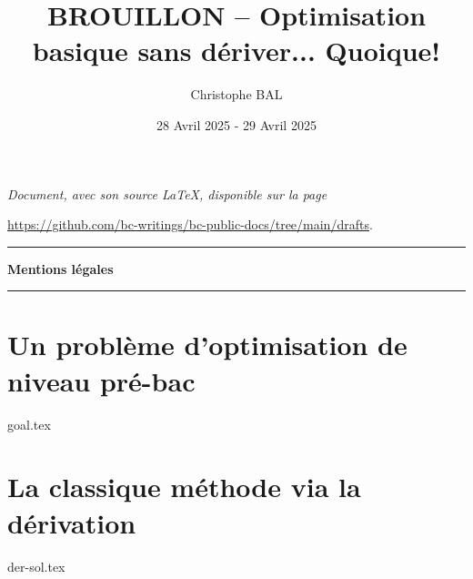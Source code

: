 \documentclass[12pt]{amsart}
\begin{document}
\title{BROUILLON -- Optimisation basique sans dériver... Quoique!}
\author{Christophe BAL}
\date{28 Avril 2025 - 29 Avril 2025}

\maketitle

\begin{center}
	\itshape
	Document, avec son source \LaTeX, disponible sur la page

	\url{https://github.com/bc-writings/bc-public-docs/tree/main/drafts}.
\end{center}


\bigskip


\begin{center}
	\hrule\vspace{.3em}
	{
		\fontsize{1.35em}{1em}\selectfont
		\textbf{Mentions \og légales \fg}
	}

	\vspace{0.45em}
	\doclicenseThis
	\hrule
\end{center}


\bigskip


\setcounter{tocdepth}{2}
\tableofcontents




\newpage





\section{Un problème d'optimisation de niveau pré-bac}

{goal.tex}





\section{La classique méthode via la dérivation}

{der-sol.tex}


\end{document}
